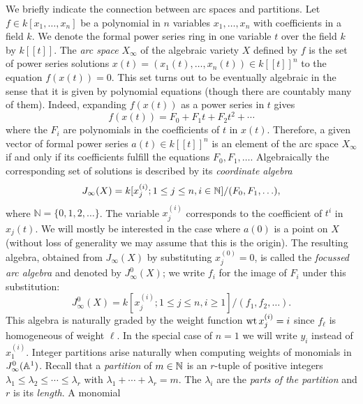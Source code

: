 We briefly indicate the connection between arc spaces and
partitions. Let $f\in k[x_1,\ldots, x_n]$ be a polynomial in $n$ variables $x_1,\ldots, x_n$
with coefficients in a field $k$. We denote the formal power series ring in one
variable $t$ over the field $k$ by $k[[t]]$. The \emph{arc
 space} $X_\infty$ of the algebraic variety $X$ defined by $f$ is the set of
power series solutions \begin{math} x(t)=(x_1(t),\ldots, x_n(t))\in k[[t]]^n
\end{math} to the equation $f(x(t))=0$. This set
turns out to be eventually algebraic in the sense that it is given by
polynomial equations (though there are countably many of
them). Indeed, expanding $f(x(t))$ as a power series in $t$
gives 
\begin{displaymath}
  f(x(t)) = F_0 + F_1t + F_2t^2 + \cdots
\end{displaymath}
where the $F_i$ are polynomials in the coefficients of $t$ in $x(t)$. Therefore, a given vector of formal
power series $a(t)\in k[[t]]^n$ is an element of the arc space
$X_\infty$ if and only if its coefficients fulfill
the equations $F_0,F_1,\dots$. Algebraically the corresponding set of
solutions is described by its \emph{coordinate algebra}
\begin{displaymath}
  J_\infty(X)= k[x_j^{(i)}; 1\leq j \leq n, i\in \mathbb{N}]/(F_0,F_1,\ldots),
\end{displaymath}
where $\mathbb{N}=\{0,1,2,\ldots \}$. The variable $x_j^{(i)}$ corresponds to the coefficient of $t^i$
in $x_j(t)$. We will mostly be interested in the case where $a(0)$
is a point on $X$ (without loss of generality we may assume that this is the origin). The resulting algebra, obtained from $J_\infty(X)$
by substituting $x_j^{(0)}=0$, is called the \emph{focussed
  arc algebra} and denoted by $J_\infty^0(X)$; we write $f_i$ for
the image of $F_i$ under this substitution:
\begin{displaymath}
  J_\infty^0(X)=k[x_j^{(i)}; 1\leq j \leq n, i\geq 1]/(f_1,f_2,\ldots).
\end{displaymath}
This algebra is naturally graded by the
weight function $\textnormal{wt}\, x_j^{(i)}=i$ since $f_{\ell}$ is homogeneous of weight $\ell$. In
the special case of $n=1$ we will write $y_i$ instead of
$x_1^{(i)}$. Integer partitions arise naturally when computing weights
of monomials in $J^0_\infty(\mathbb{A}^1)$. Recall that a \emph{partition} of
$m\in \mathbb{N}$ is an $r$-tuple of positive integers
$\lambda_1 \leq \lambda_2\leq \cdots \leq \lambda_r$ with $\lambda_1 +
\cdots + \lambda_r =m$. The $\lambda_i$ are the \emph{parts of the
  partition} and $r$ is its \emph{length}. A monomial
